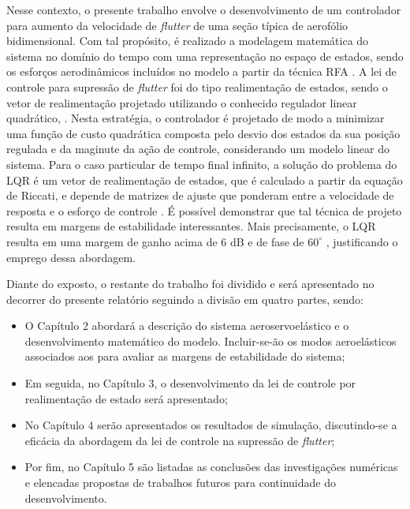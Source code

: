 Nesse contexto, o presente trabalho envolve o desenvolvimento de um controlador para aumento da velocidade de \textit{flutter} de uma seção típica de aerofólio bidimensional. Com tal propósito, é realizado a modelagem matemática do sistema no domínio do tempo com uma representação no espaço de estados, sendo os esforços aerodinâmicos incluídos no modelo a partir da técnica \gls{RFA} \cite{book:Wright-Cooper, art:NASA1367, art:NASA2776, art:RogerRFA1977}. A lei de controle para supressão de \textit{flutter} foi do tipo realimentação de estados, sendo o vetor de realimentação projetado utilizando o conhecido regulador linear quadrático, . Nesta estratégia, o controlador é projetado de modo a minimizar uma função de custo quadrática composta pelo desvio dos estados da sua posição regulada e da maginute da ação de controle, considerando um modelo linear do sistema. Para o caso particular de tempo final infinito, a solução do problema do \gls{LQR} é um vetor de realimentação de estados, que é calculado a partir da equação de Riccati, e depende de matrizes de ajuste que ponderam entre a velocidade de resposta e o esforço de controle \cite{book:Franklin}. É possível demonstrar que tal técnica de projeto resulta em margens de estabilidade interessantes. Mais precisamente, o \gls{LQR} resulta em uma margem de ganho acima de 6 dB e de fase de $60^{\circ}$ \cite{art:Anderson-1966, book:Anderson-1971}, justificando o emprego dessa abordagem.

Diante do exposto, o restante do trabalho foi dividido e será apresentado no decorrer do presente relatório seguindo a divisão em quatro partes, sendo:

\begin{itemize}
    \item O Capítulo 2 abordará a descrição do sistema aeroservoelástico e o desenvolvimento matemático do modelo. Incluir-se-ão os modos aeroelásticos associados aos  para avaliar as margens de estabilidade do sistema;
    \item Em seguida, no Capítulo 3, o desenvolvimento da lei de controle por realimentação de estado será apresentado;
    \item No Capítulo 4 serão apresentados os resultados de simulação, discutindo-se a eficácia da abordagem da lei de controle na supressão de \textit{flutter};
    \item Por fim, no Capítulo 5 são listadas as conclusões das investigações numéricas e elencadas propostas de trabalhos futuros para continuidade do desenvolvimento.
\end{itemize}

